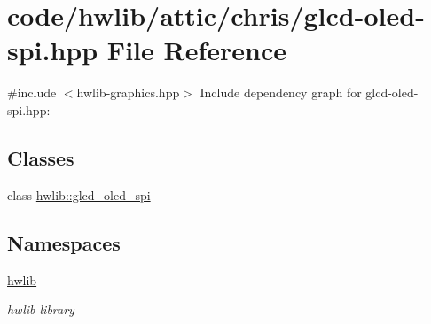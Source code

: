 \hypertarget{glcd-oled-spi_8hpp}{}\section{code/hwlib/attic/chris/glcd-\/oled-\/spi.hpp File Reference}
\label{glcd-oled-spi_8hpp}
{\ttfamily \#include $<$hwlib-\/graphics.\+hpp$>$}\newline
Include dependency graph for glcd-\/oled-\/spi.hpp\+:
\subsection*{Classes}
\begin{DoxyCompactItemize}
\item 
class \hyperlink{classhwlib_1_1glcd__oled__spi}{hwlib\+::glcd\+\_\+oled\+\_\+spi}
\end{DoxyCompactItemize}
\subsection*{Namespaces}
\begin{DoxyCompactItemize}
\item 
 \hyperlink{namespacehwlib}{hwlib}
\begin{DoxyCompactList}\small\item\em hwlib library \end{DoxyCompactList}\end{DoxyCompactItemize}
